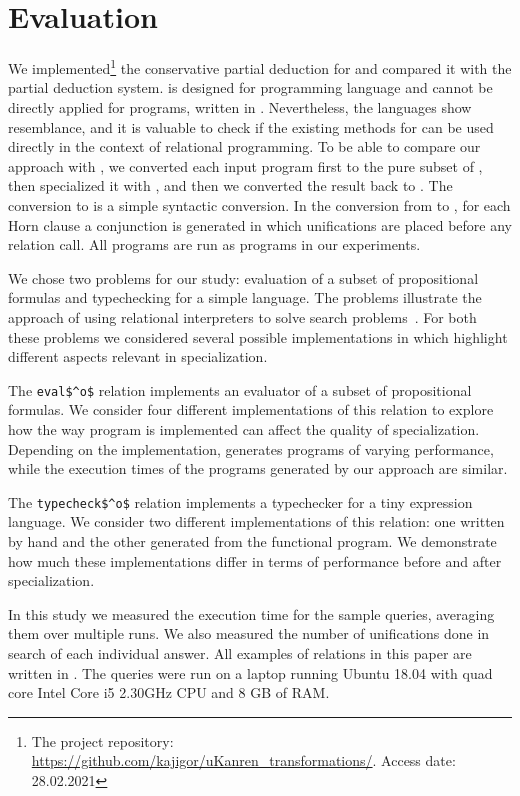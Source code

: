 \section{Evaluation}

We implemented\footnote{The project repository: \url{https://github.com/kajigor/uKanren_transformations/}. Access date: 28.02.2021} the conservative partial deduction for \mk and compared it with the \ecce partial deduction system.
\ecce is designed for \pro programming language and cannot be directly applied for programs, written in \mk.
Nevertheless, the languages show resemblance, and it is valuable to check if the existing methods for \pro can be used directly in the context of relational programming.
To be able to compare our approach with \ecce, we converted each input program first to the pure subset of \pro, then specialized it with \ecce, and then we converted the result back to \mk.
The conversion to \pro is a simple syntactic conversion. In the conversion from \pro to \mk, for each Horn clause a conjunction is generated in which unifications are placed before any relation call.
All programs are run as \mk programs in our experiments.

We chose two problems for our study: evaluation of a subset of propositional formulas and typechecking for a simple language.
The problems illustrate the approach of using relational interpreters to solve search problems~\cite{lozov2019relational}.
For both these problems we considered several possible implementations in \mk which highlight different aspects relevant in specialization.

The \lstinline{eval$^o$} relation implements an evaluator of a subset of propositional formulas.
We consider four different implementations of this relation to explore how the way program is implemented can affect the quality of specialization.
Depending on the implementation, \ecce generates programs of varying performance, while the execution times of the programs generated by our approach are similar.

The \lstinline{typecheck$^o$} relation implements a typechecker for a tiny expression language.
We consider two different implementations of this relation: one written by hand and the other generated from the functional program.
We demonstrate how much these implementations differ in terms of performance before and after specialization.

In this study we measured the execution time for the sample queries, averaging them over multiple runs.
We also measured the number of unifications done in search of each individual answer.
All examples of \mk relations in this paper are written in \oc.
The queries were run on a laptop running Ubuntu 18.04 with quad core Intel Core i5 2.30GHz CPU and 8 GB of RAM.

